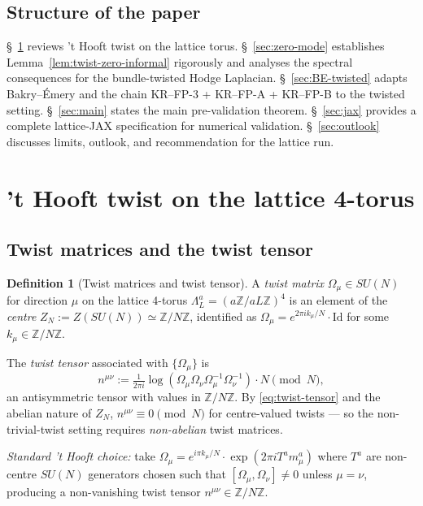 \documentclass[11pt,a4paper]{amsart}
\theoremstyle{definition}
\newtheorem{definition}[theorem]{Definition}
\newcommand{\Z}{\mathbb{Z}}
\begin{document}
\subsection{Structure of the paper}
\S~\ref{sec:tHooft} reviews 't Hooft twist on the lattice torus.
\S~\ref{sec:zero-mode} establishes Lemma~\ref{lem:twist-zero-informal}
rigorously and analyses the spectral consequences for the
bundle-twisted Hodge Laplacian.
\S~\ref{sec:BE-twisted} adapts Bakry--\'Emery and the chain
KR--FP-3 + KR--FP-A + KR--FP-B to the twisted setting.
\S~\ref{sec:main} states the main pre-validation theorem.
\S~\ref{sec:jax} provides a complete lattice-JAX specification for
numerical validation. \S~\ref{sec:outlook} discusses limits, outlook,
and recommendation for the lattice run.

\section{'t Hooft twist on the lattice 4-torus}\label{sec:tHooft}

\subsection{Twist matrices and the twist tensor}
\begin{definition}[Twist matrices and twist tensor]\label{def:twist}
A \emph{twist matrix} $\Omega_\mu \in SU(N)$ for direction $\mu$ on the
lattice 4-torus $\Lambda_L^a = (a\Z/aL\Z)^4$ is an element of the
\emph{centre} $Z_N := Z(SU(N)) \simeq \Z/N\Z$, identified as
$\Omega_\mu = e^{2\pi i k_\mu/N}\cdot \mathrm{Id}$ for some
$k_\mu \in \Z/N\Z$.

The \emph{twist tensor} associated with $\{\Omega_\mu\}$ is
\begin{equation}\label{eq:twist-tensor}
n^{\mu\nu} := \tfrac{1}{2\pi i} \log(\Omega_\mu \Omega_\nu
\Omega_\mu^{-1}\Omega_\nu^{-1}) \cdot N \pmod N,
\end{equation}
an antisymmetric tensor with values in $\Z/N\Z$. By
\eqref{eq:twist-tensor} and the abelian nature of $Z_N$,
$n^{\mu\nu} \equiv 0 \pmod N$ for centre-valued twists --- so the
non-trivial-twist setting requires \emph{non-abelian} twist matrices.

\emph{Standard 't Hooft choice:} take $\Omega_\mu = e^{i\pi k_\mu/N}
\cdot \exp(2\pi i T^a m^a_\mu)$ where $T^a$ are non-centre $SU(N)$
generators chosen such that $[\Omega_\mu, \Omega_\nu] \neq 0$ unless
$\mu = \nu$, producing a non-vanishing twist tensor
$n^{\mu\nu} \in \Z/N\Z$.
\end{definition}
\end{document}
